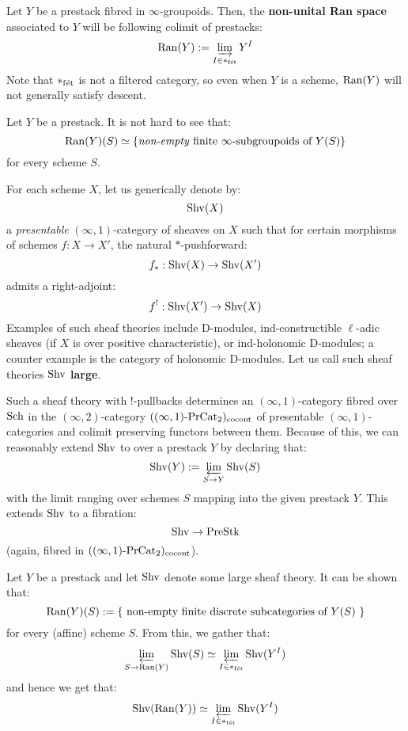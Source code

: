             \begin{definition} \label{def: non_unital_ran_spaces}
                Let $Y$ be a prestack fibred in $\infty$-groupoids. Then, the \textbf{non-unital Ran space} associated to $Y$ will be following colimit of prestacks:
                    $$\operatorname{Ran}(Y) := \varinjlim_{I \in *_{\mathrm{f\acute{e}t}}} Y^I$$
                Note that $*_{\mathrm{f\acute{e}t}}$ is not a filtered category, so even when $Y$ is a scheme, $\operatorname{Ran}(Y)$ will not generally satisfy descent.
            \end{definition}
            \begin{remark}
                Let $Y$ be a prestack. It is not hard to see that:
                    $$\operatorname{Ran}(Y)(S) \simeq \{ \text{\textit{non-empty} finite $\infty$-subgroupoids of $Y(S)$} \}$$
                for every scheme $S$.
            \end{remark}
            \begin{remark}
                For each scheme $X$, let us generically denote by:
                    $$\mathrm{Shv}(X)$$
                a \textit{presentable} $(\infty, 1)$-category of sheaves on $X$ such that for certain morphisms of schemes $f: X \to X'$, the natural $*$-pushforward:
                    $$f_*: \mathrm{Shv}(X) \to \mathrm{Shv}(X')$$
                admits a right-adjoint:
                    $$f^!: \mathrm{Shv}(X') \to \mathrm{Shv}(X)$$
                Examples of such sheaf theories include D-modules, ind-constructible $\ell$-adic sheaves (if $X$ is over positive characteristic), or ind-holonomic D-modules; a counter example is the category of holonomic D-modules. Let us call such sheaf theories $\mathrm{Shv}$ \textbf{large}.

                Such a sheaf theory with $!$-pullbacks determines an $(\infty, 1)$-category fibred over $\mathrm{Sch}$ in the $(\infty, 2)$-category $((\infty, 1)\text{-}\mathrm{Pr}\mathrm{Cat}_2)_{\mathrm{co}\mathrm{cont}}$ of presentable $(\infty, 1)$-categories and colimit preserving functors between them. Because of this, we can reasonably extend $\mathrm{Shv}$ to over a prestack $Y$ by declaring that:
                    $$\mathrm{Shv}(Y) := \varprojlim_{S \to Y} \mathrm{Shv}(S)$$
                with the limit ranging over schemes $S$ mapping into the given prestack $Y$. This extends $\mathrm{Shv}$ to a fibration:
                    $$\mathrm{Shv} \to \mathrm{Pre}\mathrm{Stk}$$
                (again, fibred in $((\infty, 1)\text{-}\mathrm{Pr}\mathrm{Cat}_2)_{\mathrm{co}\mathrm{cont}}$).
            \end{remark}
            \begin{example}
                Let $Y$ be a prestack and let $\mathrm{Shv}$ denote some large sheaf theory. It can be shown that:
                    $$\operatorname{Ran}(Y)(S) := \{ \text{ non-empty finite discrete subcategories of $Y(S)$ } \}$$
                for every (affine) scheme $S$. From this, we gather that:
                    $$\varprojlim_{S \to \operatorname{Ran}(Y)} \mathrm{Shv}(S) \simeq \varprojlim_{I \in *_{\mathrm{f\acute{e}t}}} \mathrm{Shv}(Y^I)$$
                and hence we get that:
                    $$\mathrm{Shv}(\operatorname{Ran}(Y)) \simeq \varprojlim_{I \in *_{\mathrm{f\acute{e}t}}} \mathrm{Shv}(Y^I)$$
            \end{example}

